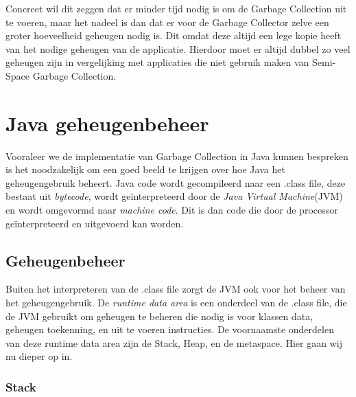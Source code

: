 Concreet wil dit zeggen dat er minder tijd nodig is om de Garbage Collection uit te voeren, maar het nadeel is dan dat er voor de Garbage Collector zelve een groter hoeveelheid geheugen nodig is.
Dit omdat deze altijd een lege kopie heeft van het nodige geheugen van de applicatie.
Hierdoor moet er altijd dubbel zo veel geheugen zijn in vergelijking met applicaties die niet gebruik maken van Semi-Space Garbage Collection. \autocite{Siqiu2019}


\section{Java geheugenbeheer}
\label{sec:java geheugenbeheer}
Vooraleer we de implementatie van Garbage Collection in Java kunnen bespreken is het noodzakelijk om een goed beeld te krijgen over hoe Java het geheugengebruik beheert.
Java code wordt gecompileerd naar een .class file, deze bestaat uit \textit{bytecode}, wordt geïnterpreteerd door de \textit{Java Virtual Machine}(JVM) en wordt omgevormd naar \textit{machine code}.
Dit is dan code die door de processor geïnterpreteerd en uitgevoerd kan worden.

\subsection{Geheugenbeheer}

Buiten het interpreteren van de .class file zorgt de JVM ook voor het beheer van het geheugengebruik.
De \textit{runtime data area} is een onderdeel van de .class file, die de JVM gebruikt om geheugen te beheren die nodig is voor klassen data, geheugen toekenning, en uit te voeren instructies.\autocite{Putten2022}
De voornaamste onderdelen van deze runtime data area zijn de Stack, Heap, en de metaspace.
Hier gaan wij nu dieper op in.

\subsubsection{Stack}
\label{sec:Stack}

